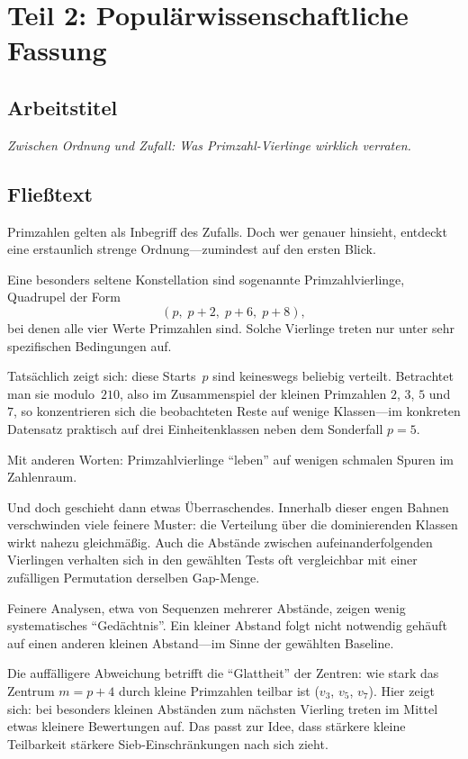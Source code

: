 \documentclass[11pt,a4paper]{article}
\begin{document}
\section{Teil 2: Populärwissenschaftliche Fassung}

\subsection*{Arbeitstitel}
\textit{Zwischen Ordnung und Zufall: Was Primzahl-Vierlinge wirklich verraten.}

\subsection{Fließtext}

Primzahlen gelten als Inbegriff des Zufalls. Doch wer genauer hinsieht, entdeckt eine erstaunlich strenge Ordnung---zumindest auf den ersten Blick.

Eine besonders seltene Konstellation sind sogenannte Primzahlvierlinge, Quadrupel der Form
\[
  (p,\; p+2,\; p+6,\; p+8),
\]
bei denen alle vier Werte Primzahlen sind. Solche Vierlinge treten nur unter sehr spezifischen Bedingungen auf.

Tatsächlich zeigt sich: diese Starts~$p$ sind keineswegs beliebig verteilt. Betrachtet man sie modulo~$210$, also im Zusammenspiel der kleinen Primzahlen $2$, $3$, $5$ und~$7$, so konzentrieren sich die beobachteten Reste auf wenige Klassen---im konkreten Datensatz praktisch auf drei Einheitenklassen neben dem Sonderfall $p=5$.

Mit anderen Worten: Primzahlvierlinge ``leben'' auf wenigen schmalen Spuren im Zahlenraum.

Und doch geschieht dann etwas Überraschendes. Innerhalb dieser engen Bahnen verschwinden viele feinere Muster: die Verteilung über die dominierenden Klassen wirkt nahezu gleichmäßig. Auch die Abstände zwischen aufeinanderfolgenden Vierlingen verhalten sich in den gewählten Tests oft vergleichbar mit einer zufälligen Permutation derselben Gap-Menge.

Feinere Analysen, etwa von Sequenzen mehrerer Abstände, zeigen wenig systematisches ``Gedächtnis''. Ein kleiner Abstand folgt nicht notwendig gehäuft auf einen anderen kleinen Abstand---im Sinne der gewählten Baseline.

Die auffälligere Abweichung betrifft die ``Glattheit'' der Zentren: wie stark das Zentrum $m=p+4$ durch kleine Primzahlen teilbar ist ($v_3$, $v_5$, $v_7$). Hier zeigt sich: bei besonders kleinen Abständen zum nächsten Vierling treten im Mittel etwas kleinere Bewertungen auf. Das passt zur Idee, dass stärkere kleine Teilbarkeit stärkere Sieb-Einschränkungen nach sich zieht.
\end{document}
